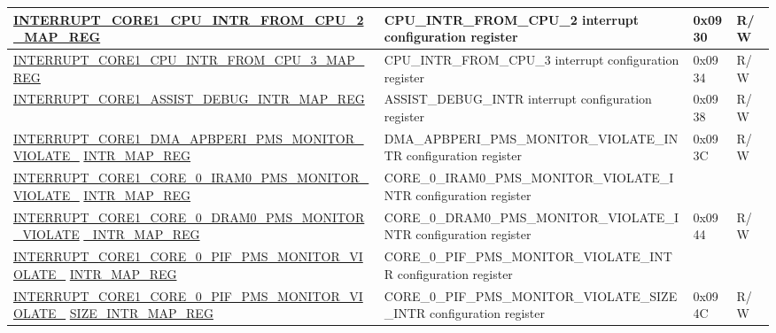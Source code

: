 \begin{landscape}
\begin{longtable}{ | p{10cm} | p{10.2cm} | p{1.3cm} | p{1cm} | }
\hyperref[regdesc:INTERRUPTCORE1CPUINTRFROMCPU2MAPREG]{INTERRUPT\_CORE1\_CPU\_INTR\_FROM\_CPU\_2\_MAP\_REG} & CPU\_INTR\_FROM\_CPU\_2 interrupt configuration register & 0x0930 & R/W \\ \hline
\hyperref[regdesc:INTERRUPTCORE1CPUINTRFROMCPU3MAPREG]{INTERRUPT\_CORE1\_CPU\_INTR\_FROM\_CPU\_3\_MAP\_REG} & CPU\_INTR\_FROM\_CPU\_3 interrupt configuration register & 0x0934 & R/W \\ \hline
\hyperref[regdesc:INTERRUPTCORE1ASSISTDEBUGINTRMAPREG]{INTERRUPT\_CORE1\_ASSIST\_DEBUG\_INTR\_MAP\_REG} & ASSIST\_DEBUG\_INTR interrupt configuration register & 0x0938 & R/W \\ \hline
\hyperref[regdesc:INTERRUPTCORE1DMAAPBPERIPMSMONITORVIOLATEINTRMAPREG]{INTERRUPT\_CORE1\_DMA\_APBPERI\_PMS\_MONITOR\_VIOLATE\_} 
\hyperref[regdesc:INTERRUPTCORE1DMAAPBPERIPMSMONITORVIOLATEINTRMAPREG]{INTR\_MAP\_REG} 
& DMA\_APBPERI\_PMS\_MONITOR\_VIOLATE\_INTR configuration register & \multirow{2}{*}{0x093C} & \multirow{2}{*}{R/W} \\ \hline


\hyperref[regdesc:INTERRUPTCORE1CORE0IRAM0PMSMONITORVIOLATEINTRMAPREG]{INTERRUPT\_CORE1\_CORE\_0\_IRAM0\_PMS\_MONITOR\_VIOLATE\_}
\hyperref[regdesc:INTERRUPTCORE1CORE0IRAM0PMSMONITORVIOLATEINTRMAPREG]{INTR\_MAP\_REG} & CORE\_0\_IRAM0\_PMS\_MONITOR\_VIOLATE\_INTR configuration register & \multirow{2}{*}{0x0940} & \multirow{2}{*}{R/W} \\ \hline


\hyperref[regdesc:INTERRUPTCORE1CORE0DRAM0PMSMONITORVIOLATEINTRMAPREG]{INTERRUPT\_CORE1\_CORE\_0\_DRAM0\_PMS\_MONITOR\_VIOLATE} 
\hyperref[regdesc:INTERRUPTCORE1CORE0DRAM0PMSMONITORVIOLATEINTRMAPREG]{\_INTR\_MAP\_REG} 
& CORE\_0\_DRAM0\_PMS\_MONITOR\_VIOLATE\_INTR configuration register & \multirow{2}{*}{0x0944} & \multirow{2}{*}{R/W} \\ \hline


\hyperref[regdesc:INTERRUPTCORE1CORE0PIFPMSMONITORVIOLATEINTRMAPREG]{INTERRUPT\_CORE1\_CORE\_0\_PIF\_PMS\_MONITOR\_VIOLATE\_} 
\hyperref[regdesc:INTERRUPTCORE1CORE0PIFPMSMONITORVIOLATEINTRMAPREG]{INTR\_MAP\_REG}
& CORE\_0\_PIF\_PMS\_MONITOR\_VIOLATE\_INTR configuration register & \multirow{2}{*}{0x0948} & \multirow{2}{*}{R/W} \\ \hline


\hyperref[regdesc:INTERRUPTCORE1CORE0PIFPMSMONITORVIOLATESIZEINTRMAPREG]{INTERRUPT\_CORE1\_CORE\_0\_PIF\_PMS\_MONITOR\_VIOLATE\_} 
\hyperref[regdesc:INTERRUPTCORE1CORE0PIFPMSMONITORVIOLATESIZEINTRMAPREG]{SIZE\_INTR\_MAP\_REG} 
& CORE\_0\_PIF\_PMS\_MONITOR\_VIOLATE\_SIZE\_INTR configuration register & \multirow{2}{*}{0x094C} & \multirow{2}{*}{R/W} \\ \hline



\end{longtable}
\end{landscape}
